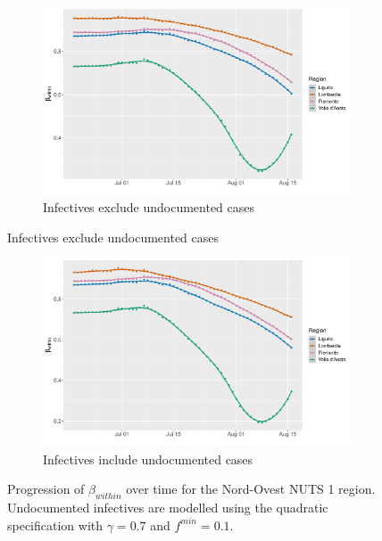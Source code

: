 \documentclass[12pt]{article}
\begin{document}
\begin{appendices}
		\begin{figure}[H]
    	    \centering
    	    \begin{subfigure}{\textwidth}
    	      \centering
    	      \includegraphics[width=0.85\linewidth]{output/model_within_lag14_betawithin_Nord-Ovest_rolling.pdf}
    	      \caption{Infectives exclude undocumented cases}
    	      \label{fig:beta_within_over_time_northwest_regular}
    	    \end{subfigure}
        \end{figure}
        \begin{figure}[H]\ContinuedFloat
    	    \begin{subfigure}{\textwidth}
    	      \centering
    	      \includegraphics[width=0.85\linewidth]{output/model_within_lag14_betawithin_Nord-Ovest_UndocQuadratic_rolling.pdf}
    	      \caption{Infectives include undocumented cases}
    	      \label{fig:beta_within_over_time_northwest_regular_undoc}
    	    \end{subfigure}
    	    \caption{Progression of $\beta_{within}$ over time for the Nord-Ovest NUTS 1 region. Undocumented infectives are modelled using the quadratic specification with $\gamma = 0.7$ and $f^{min}=0.1$.}
    	    \label{fig:beta_within_over_time_northwest}
    	\end{figure}
		

\end{appendices}
\end{document}

